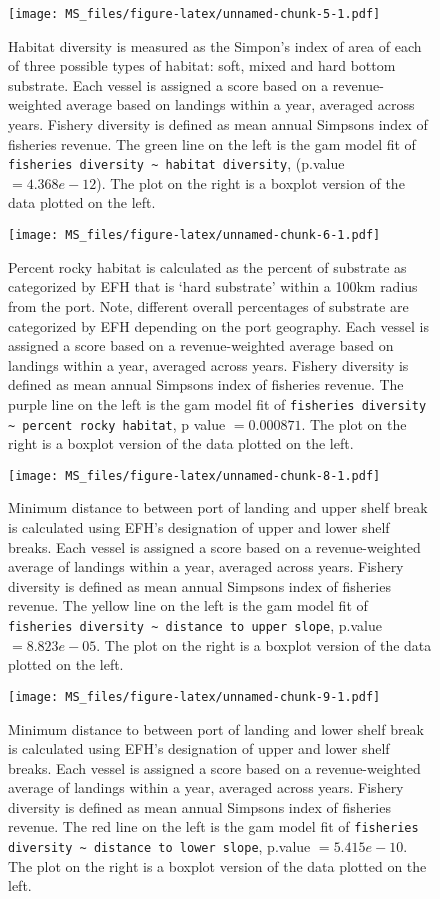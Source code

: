 \documentclass[]{article}
\begin{document}
\begin{figure}[htbp]
\centering
\texttt{[image: MS\_files/figure-latex/unnamed-chunk-5-1.pdf]}
\caption{Habitat diversity is measured as the Simpon's index of area of
each of three possible types of habitat: soft, mixed and hard bottom
substrate. Each vessel is assigned a score based on a revenue-weighted
average based on landings within a year, averaged across years. Fishery
diversity is defined as mean annual Simpsons index of fisheries revenue.
The green line on the left is the gam model fit of
\texttt{fisheries diversity \textasciitilde{} habitat diversity},
(p.value \(= 4.368e-12\)). The plot on the right is a boxplot version of
the data plotted on the left.}
\end{figure}

\begin{figure}[htbp]
\centering
\texttt{[image: MS\_files/figure-latex/unnamed-chunk-6-1.pdf]}
\caption{Percent rocky habitat is calculated as the percent of substrate
as categorized by EFH that is `hard substrate' within a 100km radius
from the port. Note, different overall percentages of substrate are
categorized by EFH depending on the port geography. Each vessel is
assigned a score based on a revenue-weighted average based on landings
within a year, averaged across years. Fishery diversity is defined as
mean annual Simpsons index of fisheries revenue. The purple line on the
left is the gam model fit of
\texttt{fisheries diversity \textasciitilde{} percent rocky habitat}, p
value \(=0.000871\). The plot on the right is a boxplot version of the
data plotted on the left.}
\end{figure}

\begin{figure}[htbp]
\centering
\texttt{[image: MS\_files/figure-latex/unnamed-chunk-8-1.pdf]}
\caption{Minimum distance to between port of landing and upper shelf
break is calculated using EFH's designation of upper and lower shelf
breaks. Each vessel is assigned a score based on a revenue-weighted
average of landings within a year, averaged across years. Fishery
diversity is defined as mean annual Simpsons index of fisheries revenue.
The yellow line on the left is the gam model fit of
\texttt{fisheries diversity \textasciitilde{} distance to upper slope},
p.value \(=8.823e-05\). The plot on the right is a boxplot version of
the data plotted on the left.}
\end{figure}

\begin{figure}[htbp]
\centering
\texttt{[image: MS\_files/figure-latex/unnamed-chunk-9-1.pdf]}
\caption{Minimum distance to between port of landing and lower shelf
break is calculated using EFH's designation of upper and lower shelf
breaks. Each vessel is assigned a score based on a revenue-weighted
average of landings within a year, averaged across years. Fishery
diversity is defined as mean annual Simpsons index of fisheries revenue.
The red line on the left is the gam model fit of
\texttt{fisheries diversity \textasciitilde{} distance to lower slope},
p.value \(=5.415e-10\). The plot on the right is a boxplot version of
the data plotted on the left.}
\end{figure}
\end{document}
